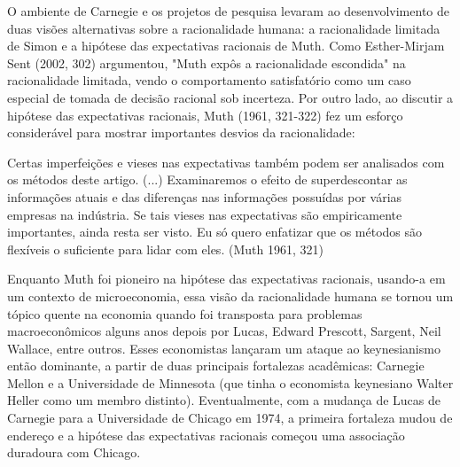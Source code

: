 \documentclass[12pt]{article}
\begin{document}
O ambiente de Carnegie e os projetos de pesquisa levaram ao desenvolvimento de duas visões alternativas sobre a racionalidade humana: a racionalidade limitada de Simon e a hipótese das expectativas racionais de Muth. Como Esther-Mirjam Sent (2002, 302) argumentou, "Muth expôs a racionalidade escondida" na racionalidade limitada, vendo o comportamento satisfatório como um caso especial de tomada de decisão racional sob incerteza. Por outro lado, ao discutir a hipótese das expectativas racionais, Muth (1961, 321-322) fez um esforço considerável para mostrar importantes desvios da racionalidade:

Certas imperfeições e vieses nas expectativas também podem ser analisados com os métodos deste artigo. (...) Examinaremos o efeito de superdescontar as informações atuais e das diferenças nas informações possuídas por várias empresas na indústria. Se tais vieses nas expectativas são empiricamente importantes, ainda resta ser visto. Eu só quero enfatizar que os métodos são flexíveis o suficiente para lidar com eles. (Muth 1961, 321)

Enquanto Muth foi pioneiro na hipótese das expectativas racionais, usando-a em um contexto de microeconomia, essa visão da racionalidade humana se tornou um tópico quente na economia quando foi transposta para problemas macroeconômicos alguns anos depois por Lucas, Edward Prescott, Sargent, Neil Wallace, entre outros. Esses economistas lançaram um ataque ao keynesianismo então dominante, a partir de duas principais fortalezas acadêmicas: Carnegie Mellon e a Universidade de Minnesota (que tinha o economista keynesiano Walter Heller como um membro distinto). Eventualmente, com a mudança de Lucas de Carnegie para a Universidade de Chicago em 1974, a primeira fortaleza mudou de endereço e a hipótese das expectativas racionais começou uma associação duradoura com Chicago.
\end{document}

